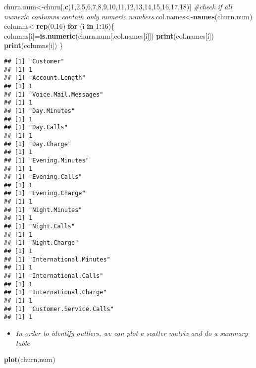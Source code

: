 \documentclass[]{article}
\newenvironment{Shaded}{\begin{snugshade}}{\end{snugshade}}
\newcommand{\CommentTok}[1]{\textcolor[rgb]{0.56,0.35,0.01}{\textit{#1}}}
\newcommand{\ControlFlowTok}[1]{\textcolor[rgb]{0.13,0.29,0.53}{\textbf{#1}}}
\newcommand{\DecValTok}[1]{\textcolor[rgb]{0.00,0.00,0.81}{#1}}
\newcommand{\KeywordTok}[1]{\textcolor[rgb]{0.13,0.29,0.53}{\textbf{#1}}}
\newcommand{\NormalTok}[1]{#1}
\newcommand{\OperatorTok}[1]{\textcolor[rgb]{0.81,0.36,0.00}{\textbf{#1}}}
\providecommand{\tightlist}{%
  \setlength{\itemsep}{0pt}\setlength{\parskip}{0pt}}
\begin{document}
\begin{Shaded}
\begin{Highlighting}[]
\NormalTok{churn.num<-churn[,}\KeywordTok{c}\NormalTok{(}\DecValTok{1}\NormalTok{,}\DecValTok{2}\NormalTok{,}\DecValTok{5}\NormalTok{,}\DecValTok{6}\NormalTok{,}\DecValTok{7}\NormalTok{,}\DecValTok{8}\NormalTok{,}\DecValTok{9}\NormalTok{,}\DecValTok{10}\NormalTok{,}\DecValTok{11}\NormalTok{,}\DecValTok{12}\NormalTok{,}\DecValTok{13}\NormalTok{,}\DecValTok{14}\NormalTok{,}\DecValTok{15}\NormalTok{,}\DecValTok{16}\NormalTok{,}\DecValTok{17}\NormalTok{,}\DecValTok{18}\NormalTok{)]}
\CommentTok{#check if all numeric coulumns contain only numeric numbers}
\NormalTok{col.names<-}\KeywordTok{names}\NormalTok{(churn.num)}
\NormalTok{columns<-}\KeywordTok{rep}\NormalTok{(}\DecValTok{0}\NormalTok{,}\DecValTok{16}\NormalTok{)}
\ControlFlowTok{for}\NormalTok{ (i }\ControlFlowTok{in} \DecValTok{1}\OperatorTok{:}\DecValTok{16}\NormalTok{)\{}
\NormalTok{  columns[i]=}\KeywordTok{is.numeric}\NormalTok{(churn.num[,col.names[i]])}
  \KeywordTok{print}\NormalTok{(col.names[i])}
  \KeywordTok{print}\NormalTok{(columns[i])}
\NormalTok{\}}
\end{Highlighting}
\end{Shaded}

\begin{verbatim}
## [1] "Customer"
## [1] 1
## [1] "Account.Length"
## [1] 1
## [1] "Voice.Mail.Messages"
## [1] 1
## [1] "Day.Minutes"
## [1] 1
## [1] "Day.Calls"
## [1] 1
## [1] "Day.Charge"
## [1] 1
## [1] "Evening.Minutes"
## [1] 1
## [1] "Evening.Calls"
## [1] 1
## [1] "Evening.Charge"
## [1] 1
## [1] "Night.Minutes"
## [1] 1
## [1] "Night.Calls"
## [1] 1
## [1] "Night.Charge"
## [1] 1
## [1] "International.Minutes"
## [1] 1
## [1] "International.Calls"
## [1] 1
## [1] "International.Charge"
## [1] 1
## [1] "Customer.Service.Calls"
## [1] 1
\end{verbatim}

\begin{itemize}
\tightlist
\item
  \emph{In order to identify outliers, we can plot a scatter matrix and
  do a summary table}
\end{itemize}

\begin{Shaded}
\begin{Highlighting}[]
\KeywordTok{plot}\NormalTok{(churn.num)}
\end{Highlighting}
\end{Shaded}
\end{document}
